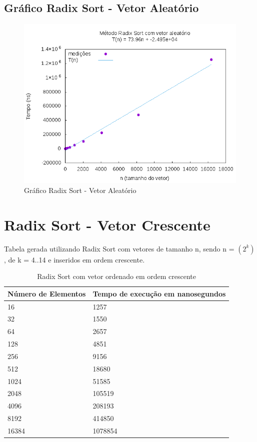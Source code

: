 \documentclass[12pt,a4paper,twoside]{report}
\begin{document}
\subsection{Gráfico Radix Sort - Vetor Aleatório}
\begin{figure}[H]
    \centering
    \includegraphics[width=0.7\linewidth]{graficos/RadixSort/vIntAleatorio/vIntAleatorio.png}
  \caption{Gráfico Radix Sort - Vetor Aleatório}
\end{figure}

\section{Radix Sort - Vetor Crescente}
Tabela gerada utilizando Radix Sort com vetores de tamanho n, sendo n = $(2^k)$, de k = 4..14 e inseridos em ordem crescente.
\begin{table}[H]
\centering
\caption{Radix Sort com vetor ordenado em ordem crescente}
\label{my-label}
\begin{tabular}{|l|l|}
\hline
\multicolumn{1}{|c|}{\textbf{Número de Elementos}} & \multicolumn{1}{c|}{\textbf{Tempo de execução em nanosegundos}} \\ \hline
16 & 1257 \\ \hline
32 & 1550 \\ \hline
64 & 2657 \\ \hline
128 & 4851 \\ \hline
256 & 9156 \\ \hline
512 & 18680 \\ \hline
1024 & 51585 \\ \hline
2048 & 105519 \\ \hline
4096 & 208193 \\ \hline
8192 & 414850 \\ \hline
16384 & 1078854 \\ \hline
\end{tabular}
\end{table}
\end{document}
